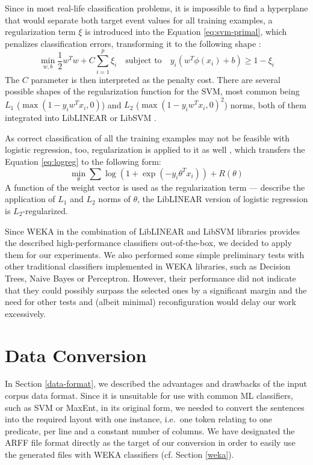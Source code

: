 \documentclass[12pt,notitlepage]{report}
\begin{document}
Since in most real-life classification problems, it is impossible to find a hyperplane that would separate both target event values for all training examples, a regularization \citep{neumaier98} term $\xi$ is introduced into the Equation \ref{eq:svm-primal}, which penalizes classification errors, transforming it to the following shape \citep{cortes95}:
\begin{equation}
\min_{w,b} \frac{1}{2}w^T w + C\sum_{i=1}^p \xi_i \quad\mbox{subject to}\quad y_i(w^T\phi(x_i) + b)\geq 1 - \xi_i
\end{equation}
The $C$ parameter is then interpreted as the penalty cost. There are several possible shapes of the regularization function for the SVM, most common being $L_1$ ($\max(1-y_i w^T x_i, 0)$) and $L_2$ ($\max(1-y_i w^T x_i, 0)^2$) norms, both of them integrated into LibLINEAR or LibSVM \citep{fan08,chang01}.

As correct classification of all the training examples may not be feasible with logistic regression, too, regularization is applied to it as well \citep{ng04,fan08}, which transfers the Equation \ref{eq:logreg} to the following form:
\begin{equation}
\min_\theta \sum\log(1 + \exp(-y_i\theta^T x_i)) + R(\theta)
\end{equation}
A function of the weight vector is used as the regularization term --- \citet{ng04} describe the application of $L_1$ and $L_2$ norms of $\theta$, the LibLINEAR version of logistic regression is $L_2$-regularized.

Since WEKA in the combination of LibLINEAR and LibSVM libraries provides the described high-performance classifiers out-of-the-box, we decided to apply them for our experiments. We also performed some simple preliminary tests with other traditional classifiers implemented in WEKA libraries, such as Decision Trees, Naive Bayes or Perceptron. However, their performance did not indicate that they could possibly surpass the selected ones by a significant margin and the need for other tests and (albeit minimal) reconfiguration would delay our work excessively.

\section{Data Conversion}\label{conversion}

In Section \ref{data-format}, we described the advantages and drawbacks of the input corpus data format. Since it is unsuitable for use with common ML classifiers, such as SVM or MaxEnt, in its original form, we needed to convert the sentences into the required layout with one instance, i.e.\ one token relating to one predicate, per line and a constant number of columns. We have designated the ARFF file format directly as the target of our conversion in order to easily use the generated files with WEKA classifiers (cf. Section \ref{weka}).
\end{document}
